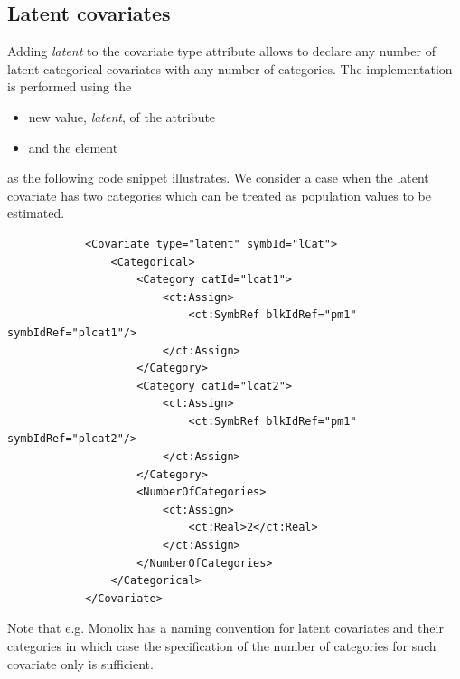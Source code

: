 \subsection{Latent covariates}
\label{subsec:latent}

Adding \textit{latent} to the covariate type attribute allows to declare
any number of latent categorical covariates with any number of
categories. The implementation is performed using the 
\begin{itemize}
\item 
new value, \textit{latent}, of the  attribute
\item 
and the  element
\end{itemize}
as the following code snippet illustrates. We consider a case when 
the latent covariate has two categories which can be treated as population 
values to be estimated.

\lstset{language=XML}
\begin{lstlisting}
            <Covariate type="latent" symbId="lCat">
                <Categorical>
                    <Category catId="lcat1">
                        <ct:Assign>
                            <ct:SymbRef blkIdRef="pm1" symbIdRef="plcat1"/>
                        </ct:Assign>
                    </Category>
                    <Category catId="lcat2">
                        <ct:Assign>
                            <ct:SymbRef blkIdRef="pm1" symbIdRef="plcat2"/>
                        </ct:Assign>
                    </Category>
                    <NumberOfCategories>
                        <ct:Assign>
                            <ct:Real>2</ct:Real>
                        </ct:Assign>
                    </NumberOfCategories>
                </Categorical>
            </Covariate>
\end{lstlisting}
Note that e.g. Monolix has a naming convention for latent covariates 
and their categories in which case the specification of the number of 
categories for such covariate only is sufficient. 



